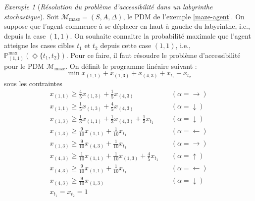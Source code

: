 \documentclass[12pt,a4paper]{report}
\theoremstyle{definition}%
\theoremstyle{remark}
\newtheorem{example}{Exemple}[chapter]
\newcommand{\pr}{\mathbb{P}}
\begin{document}
\begin{example}[\textit{Résolution du problème d'accessibilité dans un labyrinthe stochastique}]
	Soit $\mathcal{M}_{\text{maze}} = (S, A, \Delta)$, le PDM de l'exemple
	\ref{maze-agent}. On suppose que l'agent commence à se déplacer en haut à
	gauche du labyrinthe, i.e., depuis la case $(1, 1)$. On souhaite
	connaitre la probabilité maximale que l'agent atteigne les cases cibles $t_1$
	et $t_2$ depuis cette case $(1, 1)$, i.e.,
	$\pr^{\max}_{(1, 1)}(\Diamond \{t_1, t_2\})$. Pour ce faire, il faut résoudre
	le problème d'accessibilité pour le PDM $\mathcal{M}_{\text{maze}}$.
	On définit le programme linéaire suivant :
	\[
		\min x_{(1, 1)} + x_{(1, 3)} + x_{(4, 3)} + x_{t_1} + x_{t_2}
	\]
	sous les contraintes \\
 	\begin{equation*}
  \renewcommand{\arraystretch}{1.3}
  \begin{array}{ll}
		x_{(1, 1)} \geq \frac{4}{5} x_{(1, 3)} + \frac{1}{5} x_{(4, 3)}
			\quad & (\alpha = \rightarrow) \\
		x_{(1, 1)} \geq \frac{1}{5} x_{(1, 3)} + \frac{4}{5} x_{(4, 3)}
			\quad & (\alpha = \downarrow) \\
		x_{(1, 3)} \geq \frac{1}{3} x_{(1, 1)} + \frac{1}{3} x_{(4, 3)} + \frac{1}{3} x_{t_1}
			\quad & (\alpha = \downarrow) \\
		x_{(1, 3)} \geq \frac{9}{10} x_{(1, 1)} + \frac{1}{10}x_{t_1}
			\quad & (\alpha = \leftarrow) \\
		x_{(1, 3)} \geq \frac{9}{10} x_{(4, 3)} + \frac{1}{10}x_{t_1}
			\quad & (\alpha = \rightarrow)\\
		x_{(4, 3)} \geq \frac{1}{10} x_{(1, 1)} + \frac{1}{10} x_{(1, 3)} + \frac{4}{5}x_{t_1}
			\quad & (\alpha = \uparrow)\\
		x_{(4, 3)} \geq \frac{9}{10} x_{(1, 1)} + \frac{1}{10}x_{t_1}
			\quad & (\alpha = \leftarrow)\\
		x_{(4, 3)} \geq \frac{9}{10} x_{(1, 3)}
			\quad & (\alpha = \downarrow) \\
		x_{t_1} = x_{t_2} = 1
	\end{array}
 	\end{equation*}


\end{example}
\end{document}
